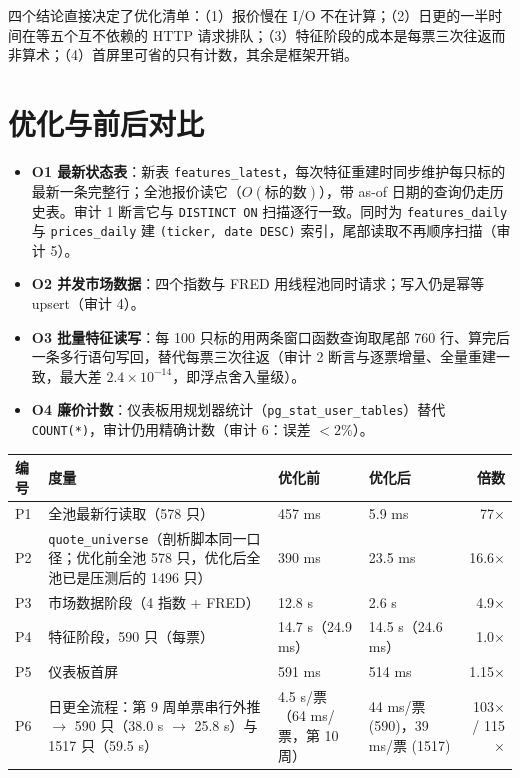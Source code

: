 \documentclass[11pt]{ctexart}
\begin{document}
四个结论直接决定了优化清单：（1）报价慢在 I/O 不在计算；（2）日更的一半时间在等五个互不依赖的 HTTP 请求排队；（3）特征阶段的成本是每票三次往返而非算术；（4）首屏里可省的只有计数，其余是框架开销。

\section{优化与前后对比}

\begin{itemize}
  \item \textbf{O1 最新状态表}：新表 \texttt{features\_latest}，每次特征重建时同步维护每只标的最新一条完整行；全池报价读它（$O(\text{标的数})$），带 as-of 日期的查询仍走历史表。审计 1 断言它与 \texttt{DISTINCT ON} 扫描逐行一致。同时为 \texttt{features\_daily} 与 \texttt{prices\_daily} 建 \texttt{(ticker, date DESC)} 索引，尾部读取不再顺序扫描（审计 5）。
  \item \textbf{O2 并发市场数据}：四个指数与 FRED 用线程池同时请求；写入仍是幂等 upsert（审计 4）。
  \item \textbf{O3 批量特征读写}：每 100 只标的用两条窗口函数查询取尾部 760 行、算完后一条多行语句写回，替代每票三次往返（审计 2 断言与逐票增量、全量重建一致，最大差 $2.4\times10^{-14}$，即浮点舍入量级）。
  \item \textbf{O4 廉价计数}：仪表板用规划器统计（\texttt{pg\_stat\_user\_tables}）替代 \texttt{COUNT(*)}，审计仍用精确计数（审计 6：误差 $<2\%$）。
\end{itemize}

\begin{center}\small
\begin{tabular}{p{0.7cm}p{5.0cm}p{3.0cm}p{3.6cm}r}
\toprule
编号 & 度量 & 优化前 & 优化后 & 倍数 \\
\midrule
P1 & 全池最新行读取（578 只） & 457 ms & 5.9 ms & 77$\times$ \\
P2 & \texttt{quote\_universe}（剖析脚本同一口径；优化前全池 578 只，优化后全池已是压测后的 1496 只） & 390 ms & 23.5 ms & 16.6$\times$ \\
P3 & 市场数据阶段（4 指数 + FRED） & 12.8 s & 2.6 s & 4.9$\times$ \\
P4 & 特征阶段，590 只（每票） & 14.7 s（24.9 ms） & 14.5 s（24.6 ms） & 1.0$\times$ \\
P5 & 仪表板首屏 & 591 ms & 514 ms & 1.15$\times$ \\
P6 & 日更全流程：第 9 周单票串行外推 $\to$ 590 只（38.0 s $\to$ 25.8 s）与 1517 只（59.5 s） & 4.5 s/票（64 ms/票，第 10 周） & 44 ms/票 (590)，39 ms/票 (1517) & 103$\times$ / 115$\times$ \\
\bottomrule
\end{tabular}
\end{center}
\end{document}
